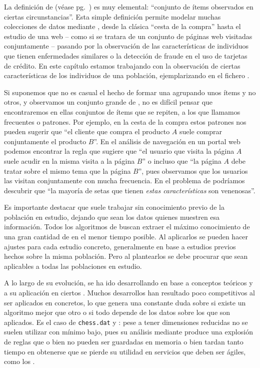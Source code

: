 La definición de \transaccion (véase pg.~\pageref{def:1:3:2:transaccion}) es muy elemental: "`conjunto de ítems observados en ciertas circunstancias"'. Esta simple definición permite modelar muchas colecciones de datos mediante \transacciones, desde la clásica "`cesta de la compra"' hasta el estudio de una \sn web -- como si se tratara de un conjunto de páginas web visitadas conjuntamente -- pasando por la observación de las características de individuos que tienen enfermedades similares o la detección de fraude en el uso de tarjetas de crédito. En este capítulo estamos trabajando con la observación de ciertas características de los individuos de una población, ejemplarizando en el fichero \mushroom.

Si suponemos que no es casual el hecho de formar una \transaccion agrupando unos ítems y no otros, y observamos un conjunto grande de \transacciones, no es difícil pensar que encontraremos en ellas conjuntos de ítems que se repiten, a los que llamamos \itemsets frecuentes o patrones. Por ejemplo, en la cesta de la compra estos patrones nos pueden sugerir que "`el cliente que compra el producto $A$ suele comprar conjuntamente el producto $B$"'. En el análisis de navegación en un portal web podemos encontrar la regla que sugiere que "`el usuario que visita la página $A$ suele acudir en la misma visita a la página $B$"' o incluso que "`la página $A$ debe tratar sobre el mismo tema que la página $B$"', pues observamos que los usuarios las visitan conjuntamente con mucha frecuencia. En el problema de \clasificacion podríamos descubrir que "`la mayoría de setas que tienen \emph{estas características} son venenosas"'.

Es importante destacar que \ARM suele trabajar sin conocimiento previo de la población en estudio, dejando que sean los datos quienes muestren esa información. Todos los algoritmos de \ARM buscan extraer el máximo conocimiento de una gran cantidad de \transacciones en el menor tiempo posible. Al aplicarlos se pueden hacer ajustes para cada estudio concreto, generalmente en base a estudios previos hechos sobre la misma población. Pero al plantearlos se debe procurar que sean aplicables a todas las poblaciones en estudio.

A lo largo de su evolución, \ARM se ha ido desarrollando en base a conceptos teóricos y a su aplicación en ciertos \datasets. Muchos desarrollos han resultado poco competitivos al ser aplicados en \datasets concretos, lo que genera una constante duda sobre si existe un algoritmo mejor que otro o si todo depende de los datos sobre los que son aplicados. Es el caso de \texttt{chess.dat} y \mushroom: pese a tener dimensiones reducidas no se suelen utilizar con \soporte mínimo bajo, pues su análisis mediante \ARM produce una explosión de reglas que o bien no pueden ser guardadas en memoria o bien tardan tanto tiempo en obtenerse que se pierde su utilidad en servicios que deben ser ágiles, como los \sr.

